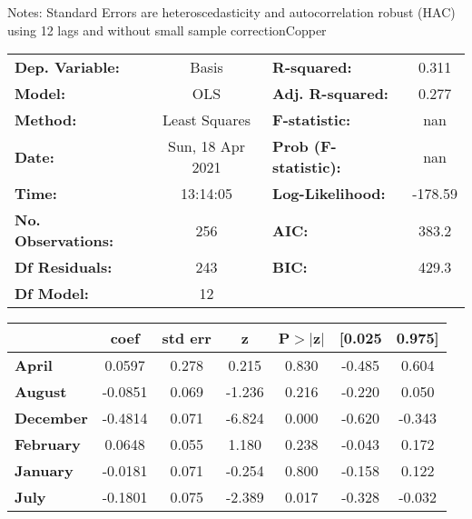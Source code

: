 Notes: \newline
 [1] Standard Errors are heteroscedasticity and autocorrelation robust (HAC) using 12 lags and without small sample correctionCopper\begin{center}
\begin{tabular}{lclc}
\toprule
\textbf{Dep. Variable:}    &      Basis       & \textbf{  R-squared:         } &     0.311   \\
\textbf{Model:}            &       OLS        & \textbf{  Adj. R-squared:    } &     0.277   \\
\textbf{Method:}           &  Least Squares   & \textbf{  F-statistic:       } &       nan   \\
\textbf{Date:}             & Sun, 18 Apr 2021 & \textbf{  Prob (F-statistic):} &      nan    \\
\textbf{Time:}             &     13:14:05     & \textbf{  Log-Likelihood:    } &   -178.59   \\
\textbf{No. Observations:} &         256      & \textbf{  AIC:               } &     383.2   \\
\textbf{Df Residuals:}     &         243      & \textbf{  BIC:               } &     429.3   \\
\textbf{Df Model:}         &          12      & \textbf{                     } &             \\
\bottomrule
\end{tabular}
\begin{tabular}{lcccccc}
                   & \textbf{coef} & \textbf{std err} & \textbf{z} & \textbf{P$> |$z$|$} & \textbf{[0.025} & \textbf{0.975]}  \\
\midrule
\textbf{April}     &       0.0597  &        0.278     &     0.215  &         0.830        &       -0.485    &        0.604     \\
\textbf{August}    &      -0.0851  &        0.069     &    -1.236  &         0.216        &       -0.220    &        0.050     \\
\textbf{December}  &      -0.4814  &        0.071     &    -6.824  &         0.000        &       -0.620    &       -0.343     \\
\textbf{February}  &       0.0648  &        0.055     &     1.180  &         0.238        &       -0.043    &        0.172     \\
\textbf{January}   &      -0.0181  &        0.071     &    -0.254  &         0.800        &       -0.158    &        0.122     \\
\textbf{July}      &      -0.1801  &        0.075     &    -2.389  &         0.017        &       -0.328    &       -0.032     \\

\end{tabular}
\end{center}
